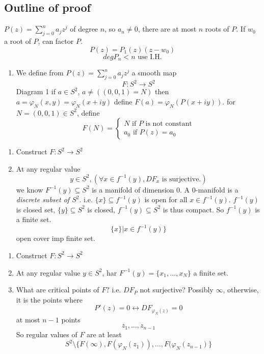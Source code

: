 \subsection*{Outline of proof}
\begin{remark}
  $P(z)=\sum_{j=0}^na_jz^j$ of degree $n$, so $a_n\neq 0$, there are at most $n$
  roots of $P$. If $w_0$ a root of $P$, can factor $P$.
    $$P(z)=P_1(z)(z-w_0)$$
    $$deg P_n<n \text{ use I.H.}$$
\end{remark}
\begin{enumerate}[(1)]
  \item  We define from $P(z)=\sum_{j=0}^na_jz^j$ a smooth map
    $$F:S^2\to S^2$$
    Diagram 1
    \newline
    if $a\in S^2$, $a\neq ((0,0,1)=N)$ then $a=\varphi _N(x,y)= \varphi _N(x+iy)$
    \newline define $F(a)=\varphi _N(P(x+iy))$.
    \newline for $N=(0,0,1)\in S^2$, define
      $$F(N)=\begin{cases}
        N \text{ if } P \text{ is not constant} \\
        a_0 \text{ if } P(z)=a_0
      \end{cases}$$
\end{enumerate}
\begin{enumerate}[(1)]
  \item Construct $F:S^2 \to S^2$
  \item At any regular value
    $$y\in S^2, \left(\forall x\in f^{-1}(y), DF_x \text{ is surjective.}\right)$$
    we know $F ^{-1}(y)\subseteq S^2$ is a manifold of dimension $0$.
    \newline A $0$-manifold is a \emph{discrete subset of $S^2$}. i.e. $\{x\}\subseteq f^{-1}(y)$ is open for all $x\in f ^{-1}(y)$.
    \newline $f^{-1}(y)$ is closed set, $\{y\}\subseteq S^2$ is closed, $f ^{-1}(y)\subseteq S^2$ is thus compact. So $f ^{-1}(y)$ is a finite set.
      $$\{x\}|x\in f^{-1}(y)\}$$
    open cover imp finite set.
\end{enumerate}
\begin{enumerate}[(1)]
  \item  Construct $F:S^2 \to S^2$
  \item  At any regular value $y\in S^2$, har $F^{-1}(y)=\{x_1,\dots ,x_N\}$ a finite set.
  \item What are critical points of $F?$
  i.e. $DF_P$ not surjective? Possibly $\infty$, otherwise, it is the points where
    $$P'(z)=0 \leftrightarrow DF_{\varphi _N(z)}=0$$
  at most $n-1$ points
    $$z_1,\dots,z_{n-1}$$
  So regular values of $F$ are at least
    $$S^2\setminus\{F(\infty),F(\varphi _N(z_1)),\dots,F(\varphi _N(z_{n-1})\}$$

\end{enumerate}
